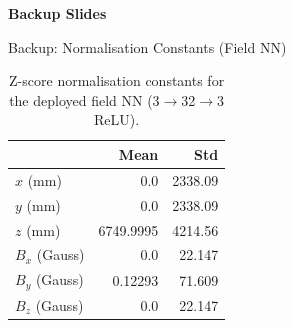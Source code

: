 \documentclass[aspectratio=169, 11pt]{beamer}
\begin{document}
\appendix

\begin{frame}[plain]
  \centering
  {\Huge\textbf{Backup Slides}}
\end{frame}


\begin{frame}{Backup: Normalisation Constants (Field NN)}

\begin{table}
\centering\small
\begin{tabular}{@{} l r r @{}}
  \toprule
  & \textbf{Mean} & \textbf{Std} \\
  \midrule
  $x$ (mm) & 0.0 & 2338.09 \\
  $y$ (mm) & 0.0 & 2338.09 \\
  $z$ (mm) & 6749.9995 & 4214.56 \\
  \midrule
  $B_x$ (Gauss) & 0.0 & 22.147 \\
  $B_y$ (Gauss) & 0.12293 & 71.609 \\
  $B_z$ (Gauss) & 0.0 & 22.147 \\
  \bottomrule
\end{tabular}
\caption*{\scriptsize Z-score normalisation constants for the deployed
          field NN (3$\to$32$\to$3 ReLU).}
\end{table}
\end{frame}
\end{document}
